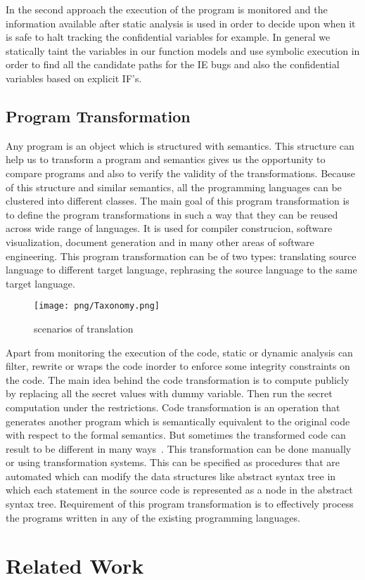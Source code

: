 In the second approach the execution of the program is monitored and 
the information available after static analysis is used in order 
to decide upon when it is safe  to halt tracking the confidential variables
for example. In general we statically taint the variables in our function models
and use symbolic execution in order to find all the candidate paths 
for the IE bugs and also the confidential variables based on explicit IF's.



\section{Program Transformation}
Any program is an object which is structured with semantics.
This structure can help us to transform a program and semantics gives
us the opportunity to compare programs and also to verify the validity
of the transformations. Because of this structure and similar 
semantics, all the programming
languages can be clustered into different classes. The main goal 
of this program transformation is to define the 
program transformations in such a way that they can be reused across
wide range of languages. It is used for compiler construcion, software 
visualization, document generation
and in many other areas of software engineering. This program transformation 
can be of two types: translating source language to different target language,
rephrasing the source language to the same target language.
\begin{figure}[!htb]
\centering
\texttt{[image: png/Taxonomy.png]}
\caption{scenarios of translation}
\label{fig:taxonomy}
\end{figure}
Apart from monitoring the execution of the code, 
static or dynamic analysis can filter,
rewrite or wraps the code inorder to enforce some integrity 
constraints on the code.
The main idea behind the code transformation is to
compute publicly by replacing
all the secret values with dummy variable. Then run the secret computation
under the restrictions. Code transformation is an operation that generates
another program which is semantically equivalent to the original code with
respect to the formal semantics. But sometimes the transformed code can result
to be different in many ways~\cite{Ward:code}. This transformation can be done 
manually or using transformation systems. This can be specified as procedures
that are automated which can modify the data structures like abstract syntax tree
in which each statement in the source code is represented as a node in the 
abstract syntax tree. Requirement of this program transformation is to 
effectively process the programs written in any of the existing programming
languages.

\chapter{Related Work}
\label{chapter:related}